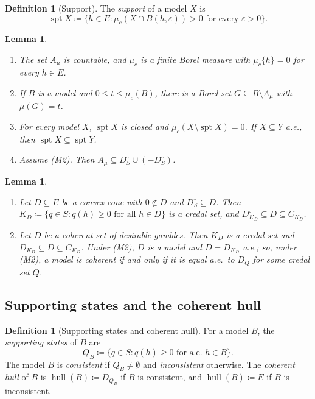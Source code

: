 \documentclass[11pt]{article}
\newcommand{\hull}{\operatorname{hull}}
\DeclareMathOperator{\spt}{spt}
\theoremstyle{plain}
\newtheorem{lemma}[theorem]{Lemma}
\theoremstyle{definition}
\newtheorem{definition}[theorem]{Definition}
\begin{document}
\begin{definition}[Support]\label{def:spt}
The \emph{support} of a model $X$ is
\[
  \spt X\coloneqq\{h\in E:\mu_c(X\cap B(h,\varepsilon))>0\text{ for every }\varepsilon>0\}.
\]
\end{definition}

\begin{lemma}\label{lem:tools}
\begin{enumerate}[label=(\alph*)]
  \item The set $A_\mu$ is countable, and $\mu_c$ is a finite Borel measure with $\mu_c\{h\}=0$
  for every $h\in E$.
  \item If $B$ is a model and $0\le t\le\mu_c(B)$, there is a Borel set $G\subseteq B\setminus
  A_\mu$ with $\mu(G)=t$.
  \item For every model $X$, $\spt X$ is closed and $\mu_c(X\setminus\spt X)=0$. If $X\subseteq
  Y$ a.e., then $\spt X\subseteq\spt Y$.
  \item Assume (M2). Then $A_\mu\subseteq D_S^\circ\cup(-D_S^\circ)$.
\end{enumerate}
\end{lemma}

\begin{lemma}\label{lem:identify}
\begin{enumerate}[label=(\alph*)]
  \item Let $D\subseteq E$ be a convex cone with $0\notin D$ and $D_S^\circ\subseteq D$. Then
  $K_D\coloneqq\{q\in S:q(h)\ge0\text{ for all }h\in D\}$ is a credal set, and
  $D^\circ_{K_D}\subseteq D\subseteq C_{K_D}$.
  \item Let $D$ be a coherent set of desirable gambles. Then $K_D$ is a credal set and
  $D_{K_D}\subseteq D\subseteq C_{K_D}$. Under (M2), $D$ is a model and $D=D_{K_D}$ a.e.; so,
  under (M2), a model is coherent if and only if it is equal a.e.\ to $D_Q$ for some credal set
  $Q$.
\end{enumerate}
\end{lemma}

\subsection{Supporting states and the coherent hull}

\begin{definition}[Supporting states and coherent hull]\label{def:hull}
For a model $B$, the \emph{supporting states} of $B$ are
\[
  Q_B\coloneqq\{q\in S:q(h)\ge0\text{ for a.e.\ }h\in B\}.
\]
The model $B$ is \emph{consistent} if $Q_B\ne\emptyset$ and \emph{inconsistent} otherwise. The
\emph{coherent hull} of $B$ is $\hull(B)\coloneqq D_{Q_B}$ if $B$ is consistent, and
$\hull(B)\coloneqq E$ if $B$ is inconsistent.
\end{definition}
\end{document}
